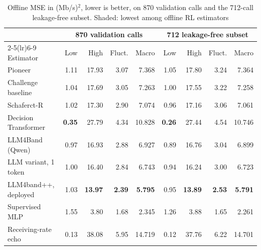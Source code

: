 \begin{table}[t]
\centering
\begin{threeparttable}
\caption{Offline MSE in \textnormal{(Mb/s)$^2$}, lower is better, on 870 validation calls and the 712-call leakage-free subset. Shaded: lowest among offline RL estimators}
\label{tab:offline}
\footnotesize
\begin{tabular*}{\textwidth}{@{\extracolsep{\fill}}lrrrrrrrr}
\toprule
& \multicolumn{4}{c}{870 validation calls} & \multicolumn{4}{c}{712 leakage-free subset} \\ \cmidrule(lr){2-5}\cmidrule(lr){6-9}
Estimator & Low & High & Fluct. & Macro & Low & High & Fluct. & Macro \\
\midrule
Pioneer & 1.11 & 17.93 & 3.07 & 7.368 & 1.05 & 17.80 & 3.24 & 7.364 \\
Challenge baseline & 1.04 & 17.69 & 3.05 & 7.263 & 1.00 & 17.55 & 3.22 & 7.258 \\
Schaferct-R & 1.02 & 17.30 & 2.90 & 7.074 & 0.96 & 17.16 & 3.06 & 7.061 \\
Decision Transformer & \cellcolor{favour}\textbf{0.35} & 27.79 & 4.34 & 10.828 & \cellcolor{favour}\textbf{0.26} & 27.44 & 4.54 & 10.746 \\
LLM4Band (Qwen) & 0.97 & 16.93 & 2.88 & 6.927 & 0.89 & 16.76 & 3.04 & 6.899 \\
LLM variant, 1 token & 1.00 & 16.40 & 2.84 & 6.743 & 0.94 & 16.24 & 3.00 & 6.723 \\
LLM4band++, deployed & 1.03 & \cellcolor{favour}\textbf{13.97} & \cellcolor{favour}\textbf{2.39} & \cellcolor{favour}\textbf{5.795} & 0.95 & \cellcolor{favour}\textbf{13.89} & \cellcolor{favour}\textbf{2.53} & \cellcolor{favour}\textbf{5.791} \\
\midrule
Supervised MLP & 1.55 & 3.80 & 1.68 & 2.345 & 1.26 & 3.88 & 1.65 & 2.261 \\
Receiving-rate echo & 0.13 & 38.08 & 5.95 & 14.719 & 0.12 & 37.76 & 6.22 & 14.701 \\
\bottomrule
\end{tabular*}

\end{threeparttable}
\end{table}